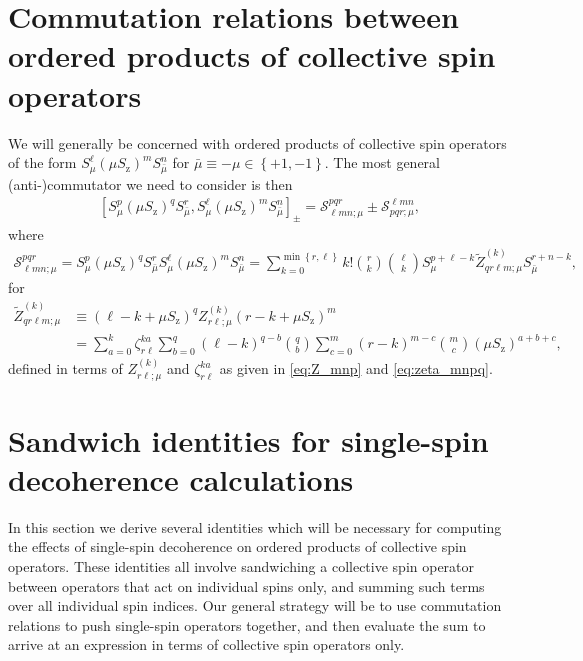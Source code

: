 \documentclass[aps,notitlepage,nofootinbib,11pt]{revtex4-1}
\newcommand{\p}[1]{\left(#1\right)} %
\renewcommand{\sp}[1]{\left[#1\right]} %
\renewcommand{\set}[1]{\left\{#1\right\}} %
\renewcommand{\S}{\mathcal{S}}
\newcommand{\z}{\text{z}}
\newcommand{\bmu}{{\bar\mu}}
\newcommand{\1}{\mathds{1}}
\begin{document}
\section{Commutation relations between ordered products of collective
  spin operators}
\label{sec:comm_general}

We will generally be concerned with ordered products of collective
spin operators of the form $S_\mu^\ell \p{\mu S_\z}^m S_\bmu^n$ for
$\bmu\equiv-\mu\in\set{+1,-1}$.  The most general (anti-)commutator we
need to consider is then
\begin{align}
  \sp{S_\mu^p \p{\mu S_\z}^q S_\bmu^r,
    S_\mu^\ell \p{\mu S_\z}^m S_\bmu^n}_\pm
  = \S^{pqr}_{\ell mn;\mu} \pm \S^{\ell mn}_{pqr;\mu},
\end{align}
where
\begin{align}
  \S^{pqr}_{\ell mn;\mu}
  = S_\mu^p \p{\mu S_\z}^q S_\bmu^r
  S_\mu^\ell \p{\mu S_\z}^m S_\bmu^n
  = \sum_{k=0}^{\min\set{r,\ell}} k! { r \choose k } { \ell \choose k }
  S_\mu^{p+\ell-k} \tilde Z_{qr\ell m;\mu}^{(k)} S_\bmu^{r+n-k},
  \label{eq:general_product}
\end{align}
for
\begin{align}
  \tilde Z_{qr\ell m;\mu}^{(k)}
  &\equiv \p{\ell-k+\mu S_\z}^q
  Z_{r\ell;\mu}^{(k)} \p{r-k+\mu S_\z}^m \\
  &= \sum_{a=0}^k \zeta_{r\ell}^{ka}
  \sum_{b=0}^q \p{\ell-k}^{q-b} { q \choose b }
  \sum_{c=0}^m \p{r-k}^{m-c} { m \choose c }
  \p{\mu S_\z}^{a+b+c},
\end{align}
defined in terms of $Z_{r\ell;\mu}^{(k)}$ and $\zeta_{r\ell}^{ka}$ as
given in \eqref{eq:Z_mnp} and \eqref{eq:zeta_mnpq}.


\section{Sandwich identities for single-spin decoherence calculations}
\label{sec:sandwich_single}

In this section we derive several identities which will be necessary
for computing the effects of single-spin decoherence on ordered
products of collective spin operators.  These identities all involve
sandwiching a collective spin operator between operators that act on
individual spins only, and summing such terms over all individual spin
indices.  Our general strategy will be to use commutation relations to
push single-spin operators together, and then evaluate the sum to
arrive at an expression in terms of collective spin operators only.
\end{document}

